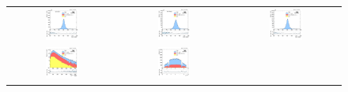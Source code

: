 \begin{figure}[ht]
  \begin{center}
    \begin{tabular}{ccc}
      \includegraphics[width=0.32\textwidth]{figures/Zprime/2017/complementary/h_mee_Zpeak_BB.png}&
      \includegraphics[width=0.32\textwidth]{figures/Zprime/2017/complementary/h_mee_Zpeak_BE.png}&
      \includegraphics[width=0.32\textwidth]{figures/Zprime/2017/complementary/h_mee_Zpeak.png}\\
      \includegraphics[width=0.32\textwidth]{figures/Zprime/2017/complementary/h_led_Et.png}&
      \includegraphics[width=0.32\textwidth]{figures/Zprime/2017/complementary/h_led_eta.png}&

\end{tabular}
\end{center}
\end{figure}
